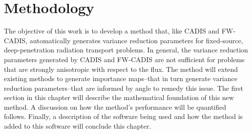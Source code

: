 \chapter{Methodology}
\label{ch:methodology}

The objective of this work is to develop a method that, like CADIS and FW-CADIS,
automatically generates variance reduction parameters for fixed-source,
deep-penetration radiation transport problems. In general, the variance reduction
parameters generated by CADIS and FW-CADIS are not sufficient for
problems that are strongly
anisotropic with respect to the flux. The method will extend existing
methods to generate importance maps--that in turn generate variance reduction
parameters--that are informed by angle to remedy this issue. The first section
in this chapter will describe
the mathematical foundation of this new method. A discussion on how
the method's performance will be quantified follows. Finally, a description of
the software being used and how the method is added to this software will
conclude this chapter.




